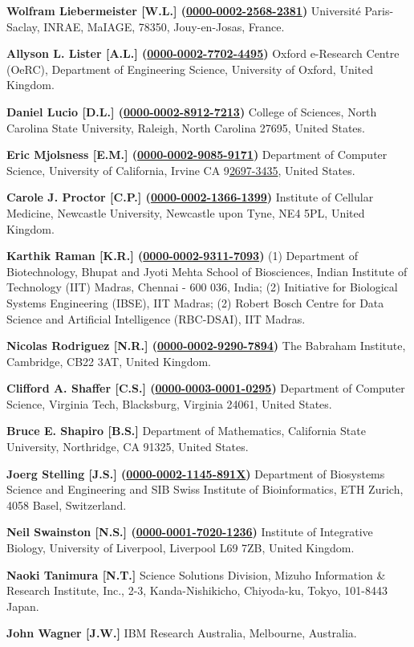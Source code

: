 \documentclass{sbml-paper}
\newcommand{\orcid}[1]{\href{https://orcid.org/#1}{#1}}
\begin{document}
\textbf{Wolfram Liebermeister [W.L.] (\orcid{0000-0002-2568-2381})} Universit\'{e} Paris-Saclay, INRAE, MaIAGE, 78350, Jouy-en-Josas, France.

\textbf{Allyson L. Lister [A.L.] (\orcid{0000-0002-7702-4495})} Oxford e-Research Centre (OeRC), Department of Engineering Science, University of Oxford, United Kingdom.

\textbf{Daniel Lucio [D.L.] (\orcid{0000-0002-8912-7213})} College of Sciences, North Carolina State University, Raleigh, North Carolina 27695, United States.

\textbf{Eric Mjolsness [E.M.] (\orcid{0000-0002-9085-9171})} Department of Computer Science, University of California, Irvine CA 9\orcid{2697-3435}, United States.

\textbf{Carole J. Proctor [C.P.] (\orcid{0000-0002-1366-1399})} Institute of Cellular Medicine, Newcastle University, Newcastle upon Tyne, NE4 5PL, United Kingdom.

\textbf{Karthik Raman [K.R.] (\orcid{0000-0002-9311-7093})} (1) Department of Biotechnology, Bhupat and Jyoti Mehta School of Biosciences, Indian Institute of Technology (IIT) Madras, Chennai - 600 036, India; (2) Initiative for Biological Systems Engineering (IBSE), IIT Madras; (2) Robert Bosch Centre for Data Science and Artificial Intelligence (RBC-DSAI), IIT Madras.

\textbf{Nicolas Rodriguez [N.R.] (\orcid{0000-0002-9290-7894})} The Babraham Institute, Cambridge, CB22 3AT, United Kingdom.

\textbf{Clifford A. Shaffer [C.S.] (\orcid{0000-0003-0001-0295})} Department of Computer Science, Virginia Tech, Blacksburg, Virginia 24061, United States.

\textbf{Bruce E. Shapiro [B.S.]} Department of Mathematics, California State University, Northridge, CA 91325, United States.

\textbf{Joerg Stelling [J.S.] (\orcid{0000-0002-1145-891X})} Department of Biosystems Science and Engineering and SIB Swiss Institute of Bioinformatics, ETH Zurich, 4058 Basel, Switzerland.

\textbf{Neil Swainston [N.S.] (\orcid{0000-0001-7020-1236})} Institute of Integrative Biology, University of Liverpool, Liverpool L69 7ZB, United Kingdom.

\textbf{Naoki Tanimura [N.T.]} Science Solutions Division, Mizuho Information \& Research Institute, Inc., 2-3, Kanda-Nishikicho, Chiyoda-ku, Tokyo, 101-8443 Japan.

\textbf{John Wagner [J.W.]} IBM Research Australia, Melbourne, Australia.
\end{document}
